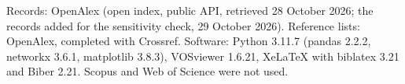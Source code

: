Records: OpenAlex (open index, public API, retrieved 28 October 2026; the records added for the sensitivity check, 29 October 2026). Reference lists: OpenAlex, completed with Crossref. Software: Python 3.11.7 (pandas 2.2.2, networkx 3.6.1, matplotlib 3.8.3), VOSviewer 1.6.21, XeLaTeX with biblatex 3.21 and Biber 2.21. Scopus and Web of Science were not used.

